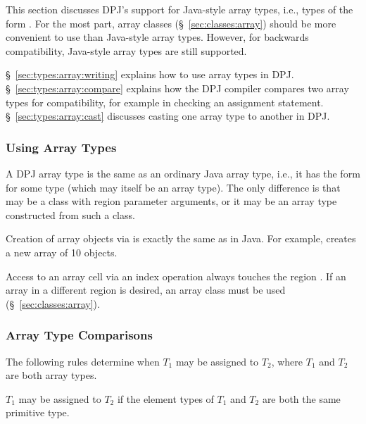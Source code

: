 This section discusses DPJ's support for Java-style array types, i.e.,
types of the form .  For the most part, array classes
(\S~\ref{sec:classes:array}) should be more convenient to use than
Java-style array types.  However, for backwards compatibility,
Java-style array types are still supported.

\S~\ref{sec:types:array:writing} explains how to use array types in
DPJ.  \S~\ref{sec:types:array:compare} explains how the DPJ compiler
compares two array types for compatibility, for example in checking an
assignment statement.  \S~\ref{sec:types:array:cast} discusses casting
one array type to another in DPJ.

\subsubsection{Using Array Types%
\label{sec:types:array:writing}}

A DPJ array type is the same as an ordinary Java array type, i.e., it
has the form  for some type  (which may itself be an
array type).  The only difference is that  may be a class with
region parameter arguments, or it may be an array type constructed
from such a class.  

Creation of array objects via  is exactly the same as in
Java.  For example,  creates a new array of 10
 objects.

Access to an array cell via an index operation always touches the
region .  If an array in a different region is desired, an
array class must be used (\S~\ref{sec:classes:array}).

\subsubsection{Array Type Comparisons%
\label{sec:types:array:compare}}

The following rules determine when $T_1$ may be assigned to $T_2$,
where $T_1$ and $T_2$ are both array types.

 $T_1$ may be assigned to
$T_2$ if the element types of $T_1$ and $T_2$ are both the same
primitive type.

